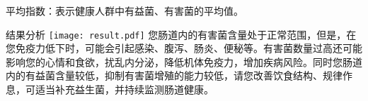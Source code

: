 \vspace*{3mm}

{\qihao 平均指数：表示健康人群中有益菌、有害菌的平均值。}

\vspace*{8mm}

\begin{spacing}{1.5}
\begin{LRaside}[.8]{结果分析}
\noindent
\texttt{[image: result.pdf]}
\asidebreak %
您肠道内的有害菌含量处于正常范围，但是，在您免疫力低下时，可能会引起感染、腹泻、肠炎、便秘等。有害菌数量过高还可能影响您的心情和食欲，扰乱内分泌，降低机体免疫力，增加疾病风险。同时您肠道内的有益菌含量较低，抑制有害菌增殖的能力较低，请您改善饮食结构、规律作息，可适当补充益生菌，并持续监测肠道健康。
\end{LRaside}
\end{spacing}


